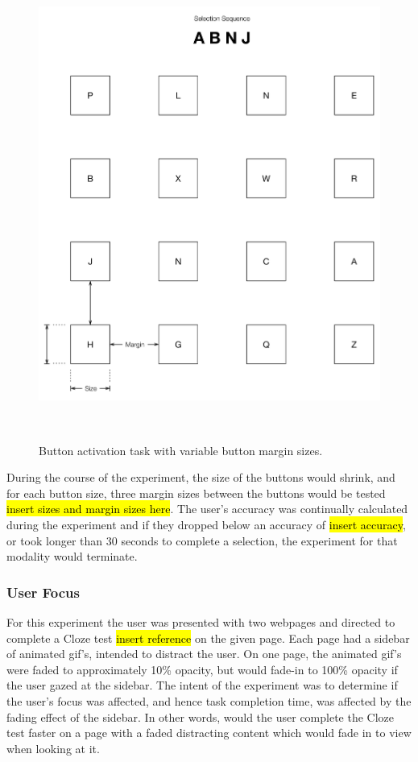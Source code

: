 \documentclass{sigchi}
\begin{document}
\begin{figure}
\centering
  \includegraphics[width=0.9\columnwidth]{figures/sui.pdf}
  \caption{Button activation task with variable button margin sizes.
  }~\label{fig:sui}
\end{figure}

During the course of the experiment, the size of the buttons would shrink, and for each button size, three margin sizes between the buttons would be tested \hl{insert sizes and margin sizes here}. The user's accuracy was continually calculated during the experiment and if they dropped below an accuracy of \hl{insert accuracy}, or took longer than 30 seconds to complete a selection, the experiment for that modality would terminate.

\subsubsection{User Focus}
For this experiment the user was presented with two webpages and directed to complete a Cloze test \hl{insert reference} on the given page. Each page had a sidebar of animated gif's, intended to distract the user. On one page, the animated gif's were faded to approximately 10\% opacity, but would fade-in to 100\% opacity if the user gazed at the sidebar. The intent of the experiment was to determine if the user's focus was affected, and hence task completion time, was affected by the fading effect of the sidebar. In other words, would the user complete the Cloze test faster on a page with a faded distracting content which would fade in to view when looking at it.
\end{document}
